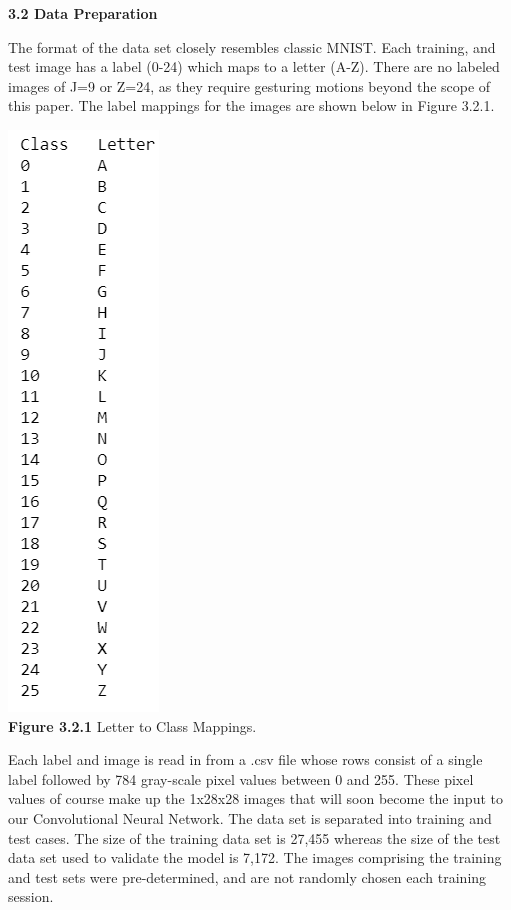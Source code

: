 \documentclass[11pt]{article}
\begin{document}
\begin{multicols}{2}
\textbf{3.2 Data Preparation}
\par
The format of the data set closely resembles classic MNIST.  Each training, and test image has a label (0-24) which maps to a letter (A-Z).  There are no labeled images of J=9 or Z=24, as they require gesturing motions beyond the scope of this paper.  The label mappings for the images are shown below in Figure 3.2.1.  
\begin{center}
\includegraphics[scale=.50]{Mappings} \\
\textbf{Figure 3.2.1} Letter to Class Mappings.
\end{center}
\par
Each label and image is read in from a .csv file whose rows consist of a single label followed by 784 gray-scale pixel values between 0 and 255.  These pixel values of course make up the 1x28x28 images that will soon become the input to our Convolutional Neural Network.  The data set is separated into training and test cases.  The size of the training data set is 27,455 whereas the size of the test data set used to validate the model is 7,172.  The images comprising the training and test sets were pre-determined, and are not randomly chosen each training session. \\

\end{multicols}
\end{document}
